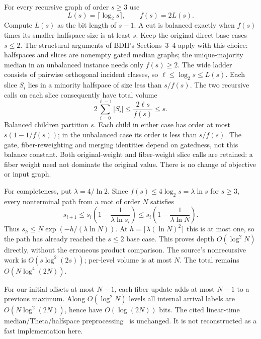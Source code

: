 \documentclass[11pt]{article}
\begin{document}
For every recursive graph of order $s\geq3$ use
\[
 L(s)=\lceil\log_2 s\rceil,\qquad f(s)=2L(s).
\]
Compute $L(s)$ as the bit length of $s-1$. A cut is balanced exactly
when $f(s)$ times its smaller halfspace size is at least $s$.
Keep the original direct base cases $s\leq2$. The structural arguments
of BDH's Sections~3--4 apply with this choice: halfspaces and slices are
nonempty gated median graphs; the unique-majority median in an
unbalanced instance needs only $f(s)\geq2$. The wide ladder consists of
pairwise orthogonal incident classes, so $\ell\leq\log_2 s\leq L(s)$.
Each slice $S_i$ lies in a minority halfspace of size less than $s/f(s)$.
The two recursive calls on each slice consequently have total volume
\[
 2\sum_{i=0}^{\ell-1}|S_i|\leq \frac{2\ell s}{f(s)}\leq s.
\]
Balanced children partition $s$. Each child in either case has order at
most $s(1-1/f(s))$; in the unbalanced case its order is less than
$s/f(s)$. The gate, fiber-reweighting and merging identities depend on
gatedness, not this balance constant. Both original-weight and
fiber-weight slice calls are retained: a fiber weight need not dominate
the original value. There is no change of objective or input graph.

For completeness, put $\lambda=4/\ln2$. Since
$f(s)\leq4\log_2 s=\lambda\ln s$ for $s\geq3$, every nonterminal
path from a root of order $N$ satisfies
\[
 s_{i+1}\leq s_i\left(1-\frac1{\lambda\ln s_i}\right)
 \leq s_i\left(1-\frac1{\lambda\ln N}\right).
\]
Thus $s_h\leq N\exp(-h/(\lambda\ln N))$. At
$h=\lceil\lambda(\ln N)^2\rceil$ this is at most one, so the path has
already reached the $s\leq2$ base case. This proves depth $O(\log^2 N)$
directly, without the erroneous product comparison. The source's
nonrecursive work is $O(s\log^2(2s))$; per-level volume is at most $N$.
The total remains $O(N\log^4(2N))$.

For our initial offsets at most $N-1$, each fiber update adds at most
$N-1$ to a previous maximum. Along $O(\log^2 N)$ levels all internal
arrival labels are $O(N\log^2(2N))$, hence have $O(\log(2N))$ bits.
The cited linear-time median/Theta/halfspace preprocessing~\cite{Median}
is unchanged. It is not reconstructed as a fast implementation here.
\end{document}
